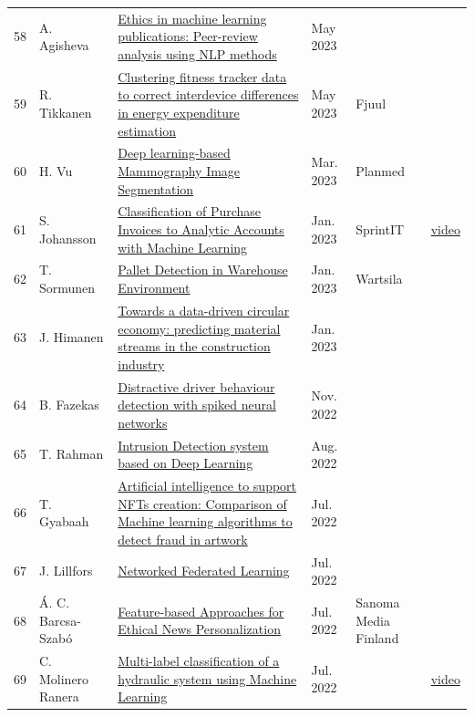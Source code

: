 \documentclass[11pt,a4paper]{article}
\begin{document}
\begin{longtable}{@{}r p{2.8cm} p{6.3cm} p{1.6cm} p{2cm} p{1.8cm}@{}}
58 & A. Agisheva & \href{https://aaltodoc.aalto.fi/handle/123456789/120999}{Ethics in machine learning publications: Peer-review analysis using NLP methods} & May 2023 &  &  \\
59 & R. Tikkanen & \href{https://urn.fi/URN:NBN:fi:aalto-202305213241}{Clustering fitness tracker data to correct interdevice differences in energy expenditure estimation} & May 2023 & Fjuul &  \\
60 & H. Vu & \href{https://aaltodoc.aalto.fi/handle/123456789/120211}{Deep learning-based Mammography Image Segmentation} & Mar. 2023 & Planmed &  \\
61 & S. Johansson & \href{https://aaltodoc.aalto.fi/handle/123456789/119486}{Classification of Purchase Invoices to Analytic Accounts with Machine Learning} & Jan. 2023 & SprintIT & \href{https://youtu.be/dL_Z5GzU4Ms}{video} \\
62 & T. Sormunen & \href{https://aaltodoc.aalto.fi/handle/123456789/119397}{Pallet Detection in Warehouse Environment} & Jan. 2023 & Wartsila &  \\
63 & J. Himanen & \href{https://aaltodoc.aalto.fi/handle/123456789/119342}{Towards a data-driven circular economy: predicting material streams in the construction industry} & Jan. 2023 &  &  \\
64 & B. Fazekas & \href{https://urn.fi/URN:NBN:fi:aalto-202211136499}{Distractive driver behaviour detection with spiked neural networks} & Nov. 2022 &  &  \\
65 & T. Rahman & \href{https://aaltodoc.aalto.fi/handle/123456789/116391}{Intrusion Detection system based on Deep Learning} & Aug. 2022 &  &  \\
66 & T. Gyabaah & \href{https://aaltodoc.aalto.fi/handle/123456789/116504}{Artificial intelligence to support NFTs creation: Comparison of Machine learning algorithms to detect fraud in artwork} & Jul. 2022 &  &  \\
67 & J. Lillfors & \href{https://aaltodoc.aalto.fi/handle/123456789/116275}{Networked Federated Learning} & Jul. 2022 &  &  \\
68 & Á. C. Barcsa-Szabó & \href{https://aaltodoc.aalto.fi/handle/123456789/116478}{Feature-based Approaches for Ethical News Personalization} & Jul. 2022 & Sanoma Media Finland &  \\
69 & C. Molinero Ranera & \href{https://aaltodoc.aalto.fi/handle/123456789/116308}{Multi-label classification of a hydraulic system using Machine Learning} & Jul. 2022 &  & \href{https://youtu.be/1HTsaSqvsz0}{video} \\

\end{longtable}
\end{document}

